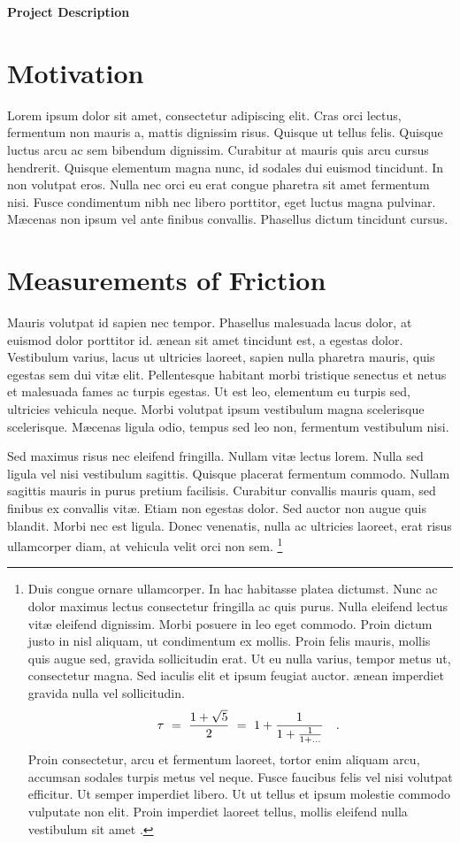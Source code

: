 \documentclass[12pt]{article}
\begin{document}
\centerline{\bf Project Description}
\setcounter{section}{0}
\section{Motivation}


Lorem ipsum dolor sit amet, consectetur adipiscing elit. Cras orci lectus, fermentum non mauris a, mattis dignissim risus. Quisque ut tellus felis. Quisque luctus arcu ac sem bibendum dignissim. Curabitur at mauris quis arcu cursus hendrerit. Quisque elementum magna nunc, id sodales dui euismod tincidunt. In non volutpat eros. Nulla nec orci eu erat congue pharetra sit amet fermentum nisi. Fusce condimentum nibh nec libero porttitor, eget luctus magna pulvinar. M{\ae}cenas non ipsum vel ante finibus convallis. Phasellus dictum tincidunt cursus.


\section{Measurements of Friction}

Mauris volutpat id sapien nec tempor. Phasellus malesuada lacus dolor, at euismod dolor porttitor id. {\ae}nean sit amet tincidunt est, a egestas dolor. Vestibulum varius, lacus ut ultricies laoreet, sapien nulla pharetra mauris, quis egestas sem dui vit{\ae} elit. Pellentesque habitant morbi tristique senectus et netus et malesuada fames ac turpis egestas. Ut est leo, elementum eu turpis sed, ultricies vehicula neque. Morbi volutpat ipsum vestibulum magna scelerisque scelerisque. M{\ae}cenas ligula odio, tempus sed leo non, fermentum vestibulum nisi.

Sed maximus risus nec eleifend fringilla. Nullam vit{\ae} lectus lorem. Nulla sed ligula vel nisi vestibulum sagittis. Quisque placerat fermentum commodo. Nullam sagittis mauris in purus pretium facilisis. Curabitur convallis mauris quam, sed finibus ex convallis vit{\ae}. Etiam non egestas dolor. Sed auctor non augue quis blandit. Morbi nec est ligula. Donec venenatis, nulla ac ultricies laoreet, erat risus ullamcorper diam, at vehicula velit orci non sem.
\footnote{%
Duis congue ornare ullamcorper. In hac habitasse platea dictumst. Nunc ac dolor maximus lectus consectetur fringilla ac quis purus. Nulla eleifend lectus vit{\ae} eleifend dignissim. Morbi posuere in leo eget commodo. Proin dictum justo in nisl aliquam, ut condimentum ex mollis. Proin felis mauris, mollis quis augue sed, gravida sollicitudin erat. Ut eu nulla varius, tempor metus ut, consectetur magna. Sed iaculis elit et ipsum feugiat auctor. {\ae}nean imperdiet gravida nulla vel sollicitudin.
$$
\tau ~=~ {{1+\sqrt5}\over2} ~=~ 1 + {1\over{1+{1\over{1+\dots}}}}\rlap{\quad.}
$$
Proin consectetur, arcu et fermentum laoreet, tortor enim aliquam arcu, accumsan sodales turpis metus vel neque. Fusce faucibus felis vel nisi volutpat efficitur. Ut semper imperdiet libero. Ut ut tellus et ipsum molestie commodo vulputate non elit. Proin imperdiet laoreet tellus, mollis eleifend nulla vestibulum sit amet \cite{Janot94,Senechal95,UsefulQuasicrystals05}.
} %
\end{document}
